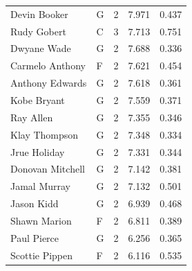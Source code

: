 \begin{table}[t]
\begin{tabular*}{\linewidth}{@{\extracolsep{\fill}}llcrr}
Devin Booker & G & 2 & 7.971 & 0.437 \\ 
Rudy Gobert & C & 3 & 7.713 & 0.751 \\ 
Dwyane Wade & G & 2 & 7.688 & 0.336 \\ 
Carmelo Anthony & F & 2 & 7.621 & 0.454 \\ 
Anthony Edwards & G & 2 & 7.618 & 0.361 \\ 
Kobe Bryant & G & 2 & 7.559 & 0.371 \\ 
Ray Allen & G & 2 & 7.355 & 0.346 \\ 
Klay Thompson & G & 2 & 7.348 & 0.334 \\ 
Jrue Holiday & G & 2 & 7.331 & 0.344 \\ 
Donovan Mitchell & G & 2 & 7.142 & 0.381 \\ 
Jamal Murray & G & 2 & 7.132 & 0.501 \\ 
Jason Kidd & G & 2 & 6.939 & 0.468 \\ 
Shawn Marion & F & 2 & 6.811 & 0.389 \\ 
Paul Pierce & G & 2 & 6.256 & 0.365 \\ 
Scottie Pippen & F & 2 & 6.116 & 0.535 \\ 
\bottomrule
\end{tabular*}
\end{table}

